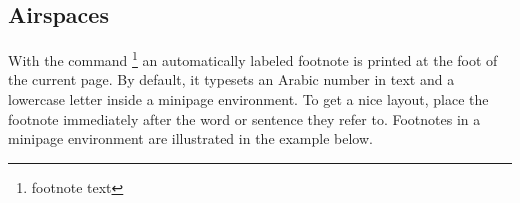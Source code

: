 %
%
%
%


\subsection{Airspaces}

With the command \footnote{footnote text} an automatically labeled footnote is printed at
the foot of the current page. By default, it typesets an Arabic number in text and a lowercase
letter inside a minipage environment. To get a nice layout, place the footnote immediately
after the word or sentence they refer to. Footnotes in a minipage environment are illustrated
in the example below.

